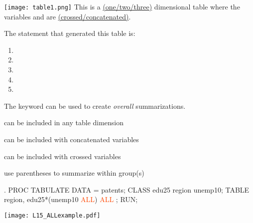 \begin{frame}
\texttt{[image: table1.png]}
\emp
{} \hspace{0.05in} \emp
{}
\oyo This is a \underline{(one/two/three)} dimensional table where the variables  and  are \underline{(crossed/concatenated)}.
\emp
\begin{clicker}{The statement that generated this table is:}
\begin{enumerate}
\item {}
\item {}
\item {}
\item {}
\item {}
\end{enumerate}
\end{clicker}
\end{frame}

\begin{frame}
The keyword  can be used to create \emph{overall} summarizations.
\vskip5pt
\bi
\item {} can be included in any table dimension
\item[] 
\item[]
\item {} can be included with concatenated variables
\item[] 
\item[]
\item {} can be included with crossed variables
\item[] 
\item[]
\item use parentheses to summarize within group(s)
\item[] 
\ei
\end{frame}

\begin{frame}[fragile]
\begin{code}{.}
PROC TABULATE DATA = patents;
   CLASS edu25 region unemp10;
   TABLE region, edu25*(unemp10 \textcolor{OrangeRed}{ALL}) \textcolor{OrangeRed}{ALL} ;
RUN;
\end{code}
\texttt{[image: L15\_ALLexample.pdf]}
\emp
\end{frame}



